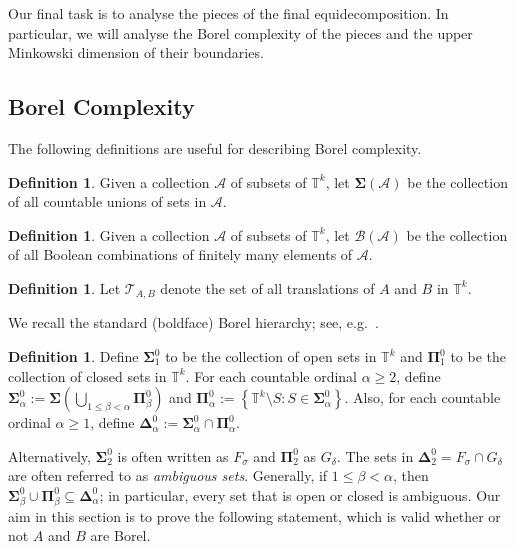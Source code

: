 \documentclass[12pt,a4paper]{amsart}
\numberwithin{equation}{section}
\newcommand{\bSigma}{\boldsymbol{\Sigma}}
\newcommand{\bPi}{\boldsymbol{\Pi}}
\newcommand{\bDelta}{\boldsymbol{\Delta}}
\newcommand{\bB}{\boldsymbol{\mathcal{B}}}
\theoremstyle{definition}
\newtheorem{defn}[equation]{Definition}
\begin{document}
Our final task is to analyse the pieces of the final equidecomposition. In particular, we will analyse the Borel complexity of the pieces and the upper Minkowski dimension of their boundaries.

\subsection{Borel Complexity}

The following definitions are useful for describing Borel complexity. 

\begin{defn}
Given a collection $\mathcal{A}$ of subsets of $\mathbb{T}^k$, let $\bSigma(\mathcal{A})$ be the collection of all countable unions of sets in $\mathcal{A}$. 
\end{defn}

\begin{defn}
Given a collection $\mathcal{A}$ of subsets of $\mathbb{T}^k$, let $\bB(\mathcal{A})$ be the collection of all Boolean combinations of finitely many elements of $\mathcal{A}$.
\end{defn}

\begin{defn}
Let $\mathcal{T}_{A,B}$ denote the set of all translations of $A$ and $B$ in $\mathbb{T}^k$. 
\end{defn}

We recall the standard (boldface) Borel hierarchy; see, e.g.~\cite[pp.~xvi--xv]{Kechris95}. 

\begin{defn}
\label{def:BorelH}
Define $\bSigma_1^0$ to be the collection of open sets in $\mathbb{T}^k$ and $\bPi_1^0$ to be the collection of closed sets in $\mathbb{T}^k$. For each countable ordinal $\alpha\geq2$, define $\bSigma_\alpha^0:=\bSigma\left(\bigcup_{1\leq \beta<\alpha}\bPi_{\beta}^0\right)$ and $\bPi_\alpha^0:=\left\{\mathbb{T}^k\setminus S: S\in \bSigma_\alpha^0\right\}$. Also, for each countable ordinal $\alpha\geq1$, define $\bDelta^0_\alpha:=\bSigma_\alpha^0\cap \bPi_\alpha^0$. 
\end{defn}

Alternatively, $\bSigma_2^0$ is often written as $F_\sigma$ and $\bPi_2^0$ as $G_\delta$. The sets in $\bDelta_2^0=F_\sigma\cap G_\delta$ are often referred to as \emph{ambiguous sets}. Generally, if $1\leq \beta<\alpha$, then $\bSigma_\beta^0\cup \bPi_\beta^0\subseteq \bDelta_\alpha^0$; in particular, every set that is open or closed is ambiguous. Our aim in this section is to prove the following statement, which is valid whether or not $A$ and $B$ are Borel. 
\end{document}
